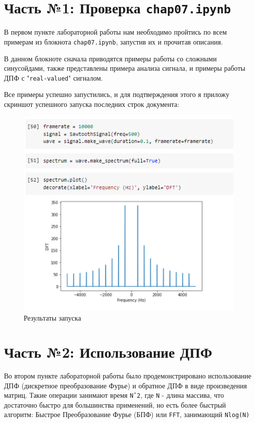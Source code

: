 \documentclass[a4paper]{article}
\begin{document}
    \newpage
        \section{Часть №1: Проверка \texttt{chap07.ipynb}}
            В первом пункте лабораторной работы нам необходимо пройтись по всем примерам из блокнота \texttt{chap07.ipynb}, запустив их и прочитав описания.
            
            В данном блокноте сначала приводятся примеры работы со сложными синусойдами, также представлены примера анализа сигнала, и примеры работы ДПФ с "\texttt{real-valued}" сигналом.
            
            Все примеры успешно запустились, и для подтверждения этого я приложу скриншот успешного запуска последних строк документа:
            
             \begin{figure}[H]
                \centering
                \includegraphics[width=\textwidth]{ex_1_all_work.png}
                \caption{Результаты запуска}
                \label{fig:ex_1_all_work}
            \end{figure}
            
    
    \newpage
        \section{Часть №2: Использование ДПФ}
            Во втором пункте лабораторной работы было продемонстрировано использование ДПФ (дискретное преобразование Фурье) и обратное ДПФ в виде произведения матриц. Такие операции занимают время \texttt{Nˆ2}, где \texttt{N} - длина массива, что достаточно быстро для большинства применений, но есть более быстрый алгоритм: Быстрое Преобразование Фурье (БПФ) или \texttt{FFT}, занимающий \texttt{Nlog(N)}
            
\end{document}
